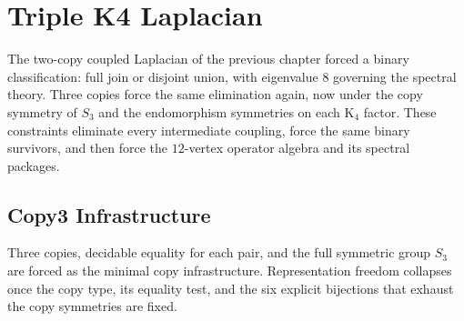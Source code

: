 \documentclass[11pt,a4paper]{book}
\def\texorpdfstring#1#2{#2}%
\begin{document}
\chapter{Triple K\texorpdfstring{$_4$}{4} Laplacian}
\label{ch:triple-laplacian}

The two-copy coupled Laplacian of the previous chapter forced a binary
classification: full join or disjoint union, with eigenvalue $8$ governing the
spectral theory.  Three copies force the same elimination again, now under the
copy symmetry of $S_3$ and the endomorphism symmetries on each K$_4$ factor.
These constraints eliminate every intermediate coupling, force the same binary
survivors, and then force the $12$-vertex operator algebra and its spectral
packages.

\section{Copy\texorpdfstring{$_3$}{3} Infrastructure}

Three copies, decidable equality for each pair, and the full symmetric group
$S_3$ are forced as the minimal copy infrastructure.  Representation freedom
collapses once the copy type, its equality test, and the six
explicit bijections that exhaust the copy symmetries are fixed.
\end{document}
